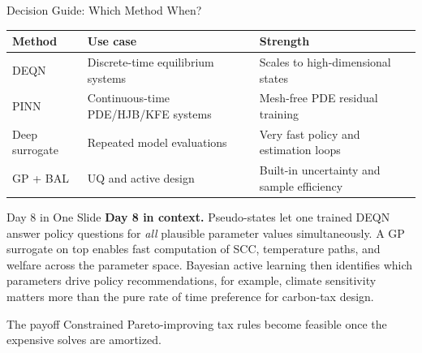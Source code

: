 \documentclass[aspectratio=169,11pt]{beamer}
\begin{document}
\begin{frame}{Decision Guide: Which Method When?}
\scriptsize
\begin{center}
\begin{tabular}{p{}p{}p{}}
\toprule
\textbf{Method} & \textbf{Use case} & \textbf{Strength} \\
\midrule
DEQN & Discrete-time equilibrium systems & Scales to high-dimensional states \\
PINN & Continuous-time PDE/HJB/KFE systems & Mesh-free PDE residual training \\
Deep surrogate & Repeated model evaluations & Very fast policy and estimation loops \\
GP + BAL & UQ and active design & Built-in uncertainty and sample efficiency \\
\bottomrule
\end{tabular}
\end{center}
\end{frame}

\begin{frame}{Day 8 in One Slide}
\textbf{Day 8 in context.}  Pseudo-states let one trained DEQN answer policy questions for \emph{all} plausible parameter values simultaneously.  A GP surrogate on top enables fast computation of SCC, temperature paths, and welfare across the parameter space.  Bayesian active learning then identifies which parameters drive policy recommendations, for example, climate sensitivity matters more than the pure rate of time preference for carbon-tax design.

\vspace{0.25cm}
\begin{exampleblock}{The payoff}
Constrained Pareto-improving tax rules become feasible once the expensive solves are amortized.
\end{exampleblock}
\end{frame}
\end{document}
